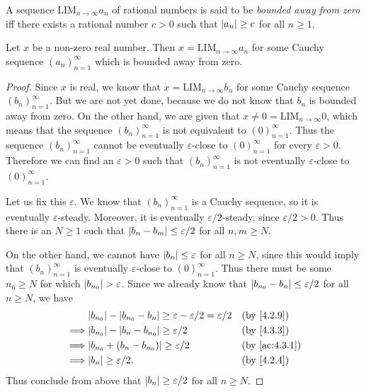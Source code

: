\begin{defn}\label{5.3.12}
  A sequence \(\text{LIM}_{n \to \infty} a_n\) of rational numbers is said to be \emph{bounded away from zero} iff there exists a rational number \(c > 0\) such that \(\left\lvert a_n\right\rvert \geq c\) for all \(n \geq 1\).
\end{defn}

\setcounter{thm}{13}
\begin{lem}\label{5.3.14}
  Let \(x\) be a non-zero real number.
  Then \(x = \text{LIM}_{n \to \infty} a_n\) for some Cauchy sequence \((a_n)_{n = 1}^{\infty}\) which is bounded away from zero.
\end{lem}

\begin{proof}
  Since \(x\) is real, we know that \(x = \text{LIM}_{n \to \infty} b_n\) for some Cauchy sequence \((b_n)_{n = 1}^{\infty}\).
  But we are not yet done, because we do not know that \(b_n\) is bounded away from zero.
  On the other hand, we are given that \(x \neq 0 = \text{LIM}_{n \to \infty} 0\), which means that the sequence \((b_n)_{n = 1}^{\infty}\) is not equivalent to \((0)_{n = 1}^{\infty}\).
  Thus the sequence \((b_n)_{n = 1}^{\infty}\) cannot be eventually \(\varepsilon\)-close to \((0)_{n = 1}^{\infty}\) for every \(\varepsilon > 0\).
  Therefore we can find an \(\varepsilon > 0\) such that \((b_n)_{n = 1}^{\infty}\) is not eventually \(\varepsilon\)-close to \((0)_{n = 1}^{\infty}\).

  Let us fix this \(\varepsilon\).
  We know that \((b_n)_{n = 1}^{\infty}\) is a Cauchy sequence, so it is eventually \(\varepsilon\)-steady.
  Moreover, it is eventually \(\varepsilon / 2\)-steady, since \(\varepsilon / 2 > 0\).
  Thus there is an \(N \geq 1\) such that \(\left\lvert b_n - b_m\right\rvert \leq \varepsilon / 2\) for all \(n, m \geq N\).

  On the other hand, we cannot have \(\left\lvert b_n\right\rvert \leq \varepsilon\) for all \(n \geq N\), since this would imply that \((b_n)_{n = 1}^{\infty}\) is eventually \(\varepsilon\)-close to \((0)_{n = 1}^{\infty}\).
  Thus there must be some \(n_0 \geq N\) for which \(\left\lvert b_{n_0}\right\rvert > \varepsilon\).
  Since we already know that \(\left\lvert b_{n_0} - b_n\right\rvert \leq \varepsilon / 2\) for all \(n \geq N\), we have
  \begin{align*}
             & \abs{b_{n_0}} - \abs{b_{n_0} - b_n} \geq \varepsilon - \varepsilon / 2 = \varepsilon / 2 &  & \by{4.2.9}    \\
    \implies & \abs{b_{n_0}} - \abs{b_n - b_{n_0}} \geq \varepsilon / 2                                 &  & \by{4.3.3}    \\
    \implies & \abs{b_{n_0} + (b_n - b_{n_0})} \geq \varepsilon / 2                                     &  & \by{ac:4.3.1} \\
    \implies & \abs{b_n} \geq \varepsilon / 2.                                                          &  & \by{4.2.4}    \\
  \end{align*}
  Thus conclude from above that \(\left\lvert b_n\right\rvert \geq \varepsilon / 2\) for all \(n \geq N\).


\end{proof}
